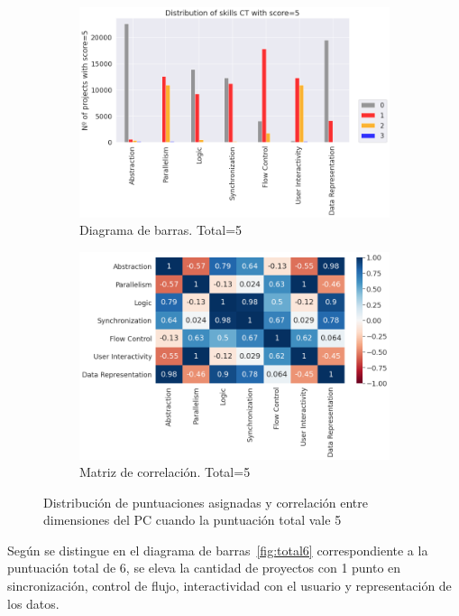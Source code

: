 \documentclass[a4paper, 12pt]{book}
\begin{document}
\begin{figure}[H]
    \centering
    \begin{subfigure}[h]{.49\textwidth} 
        \includegraphics[width=\textwidth]{img/distribucion_5_Scratch}
        \caption{Diagrama de barras. Total=5}
        \label{fig:total5}
    \end{subfigure}       
    \begin{subfigure}[h]{.49\textwidth} 
        \includegraphics[width=\textwidth]{img/corr_5_Scratch}
        \caption{Matriz de correlación. Total=5}
        \label{fig:corr5}
    \end{subfigure}
     \caption{Distribución de puntuaciones asignadas y correlación entre dimensiones del PC cuando la puntuación total vale 5}
\end{figure}

Según se distingue en el diagrama de barras~\ref{fig:total6} correspondiente a la puntuación total de 6, se eleva la cantidad de proyectos con 1 punto en sincronización, control de flujo, interactividad con el usuario y representación de los datos.
\end{document}
